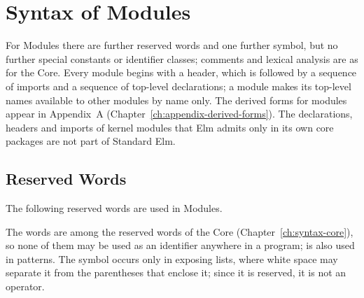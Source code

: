 \chapter{Syntax of Modules}\label{ch:syntax-modules}

For Modules there are further reserved words and one further symbol, but no
further special constants or identifier classes; comments and lexical analysis
are as for the Core. Every module begins with a header, which is followed by a
sequence of imports and a sequence of top-level declarations; a module makes its top-level names available
to other modules by name only. %
The derived forms for modules appear in
Appendix~A (Chapter~\ref{ch:appendix-derived-forms}). The 
declarations,  headers and imports of kernel modules that
Elm admits only in its own core packages are not part of Standard Elm.

\section{Reserved Words}\label{sec:syntax-modules-reserved}

The following reserved words are used in Modules.
\begin{center}
\qquad{}\qquad{}\qquad{}\qquad{}\qquad{}\qquad{}
\end{center}
The words are among the reserved words of the Core
(Chapter~\ref{ch:syntax-core}), so none of them may be used as an identifier
anywhere in a program;  is also used in patterns. The symbol 
occurs only in exposing lists, where white space may separate it from the
parentheses that enclose it; since it is reserved, it is not an operator.

